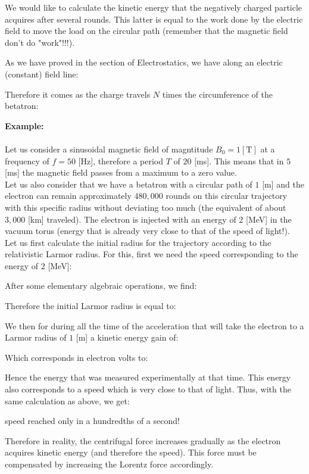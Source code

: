 	We would like to calculate the kinetic energy that the negatively charged particle acquires after several rounds. This latter is equal to the work done by the electric field to move the load on the circular path (remember that the magnetic field don't do "work"!!!).
	
	As we have proved in the section of Electrostatics, we have along an electric (constant) field line:
	
	Therefore it comes as the charge travels $N$ times the circumference of the betatron:
	
	\begin{tcolorbox}[colframe=black,colback=white,sharp corners]
	\textbf{{\Large {}}Example:}\\\\
	Let us consider a sinusoidal magnetic field of magntitude $B_0=1 [\text{T}]$ at a frequency of $f=50$ [Hz], therefore a period $T$ of $20$ [ms]. This means that in $5$ [ms] the magnetic field passes from a maximum to a zero value.\\

	Let us also consider that we have a betatron with a circular path of $1$ [m] and the electron can remain approximately $480,000$ rounds on this circular trajectory with this specific radius without deviating too much (the equivalent of about $3,000$ [km] traveled). The electron is injected with an energy of $2$ [MeV] in the vacuum torus (energy that is already very close to that of the speed of light!).\\
	
	Let us first calculate the initial radius for the trajectory according to the relativistic Larmor radius. For this, first we need the speed corresponding to the energy of $2$ [MeV]:
	
	After some elementary algebraic operations, we find:
	
	Therefore the initial Larmor radius is equal to:
	
	We then for during all the time of the acceleration that will take the electron to a Larmor radius of $1$ [m] a kinetic energy gain of:
	
	Which corresponds in electron volts to:
	
	Hence the energy that was measured experimentally at that time. This energy also corresponds to a speed which is very close to that of light. Thus, with the same calculation as above, we get:
	
	speed reached only in a hundredths of a second!
	\end{tcolorbox}
	\begin{tcolorbox}[title=Remark,colframe=black,arc=10pt]
	Therefore in reality, the centrifugal force increases gradually as the electron acquires kinetic energy (and therefore the speed). This force must be compensated by increasing the Lorentz force accordingly.
	\end{tcolorbox}
	
